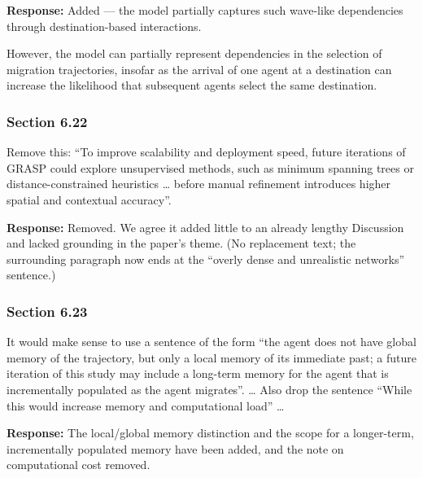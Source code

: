 \documentclass[11pt,a4paper]{article}
\begin{document}
\textbf{Response:} Added --- the model partially captures such wave-like dependencies through destination-based
interactions.

\vspace{0.3cm}
\begin{updatebox}
However, the model can partially represent dependencies in the selection of migration trajectories, insofar as the
arrival of one agent at a destination can increase the likelihood that subsequent agents select the same destination.
\end{updatebox}

\subsubsection*{Section 6.22}

\begin{reviewbox}
Remove this: ``To improve scalability and deployment speed, future iterations of GRASP could explore unsupervised methods, such as minimum spanning trees or distance-constrained heuristics \ldots{} before manual refinement introduces higher spatial and contextual accuracy''.
\end{reviewbox}

\textbf{Response:} Removed. We agree it added little to an already lengthy Discussion and lacked grounding in the
paper's theme. (No replacement text; the surrounding paragraph now ends at the ``overly dense and unrealistic
networks'' sentence.)

\subsubsection*{Section 6.23}

\begin{reviewbox}
It would make sense to use a sentence of the form ``the agent does not have global memory of the trajectory, but only a local memory of its immediate past; a future iteration of this study may include a long-term memory for the agent that is incrementally populated as the agent migrates''. \ldots{} Also drop the sentence ``While this would increase memory and computational load'' \ldots
\end{reviewbox}

\textbf{Response:} The local/global memory distinction and the scope for a longer-term, incrementally populated
memory have been added, and the note on computational cost removed.
\end{document}
